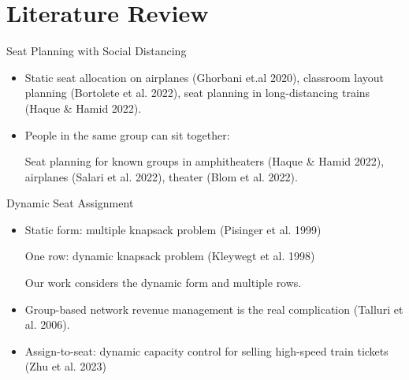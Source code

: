 
\section{Literature Review}
    \frame{\sectionpage}
    \begin{frame}{Seat Planning with Social Distancing}
      \begin{itemize}
        \item {\color{red}Static} seat allocation on {\color{green} airplanes} (Ghorbani et.al 2020), {\color{green} classroom} layout planning (Bortolete et al. 2022), seat planning in long-distancing {\color{green} trains} (Haque \& Hamid 2022).
        \vspace*{0.5cm}

        
        \item People in the same {\color{red}group can sit together}: 
        
        
        \vspace*{0.5cm} 

        Seat planning for known {\color{red}groups} in amphitheaters (Haque \& Hamid 2022), airplanes (Salari et al. 2022), {\color{green} theater} (Blom et al. 2022).   
        
        
      \end{itemize}
      \end{frame}
      
      \begin{frame}{Dynamic Seat Assignment}
        \begin{itemize}
          \item Static form: multiple knapsack problem (Pisinger et al. 1999)

                One row: dynamic knapsack problem (Kleywegt et al. 1998)

          \vspace*{0.3cm}
          Our work considers the {\color{red}dynamic form} and {\color{red}multiple rows}.

          \vspace*{0.3cm}


          \item {\color{red}Group-based} network revenue management is the real complication (Talluri et al. 2006).

          \vspace*{0.5cm}
          \item {\color{red} Assign-to-seat}: dynamic capacity control for selling high-speed train
          tickets (Zhu et al. 2023)
        \end{itemize}

      \end{frame}